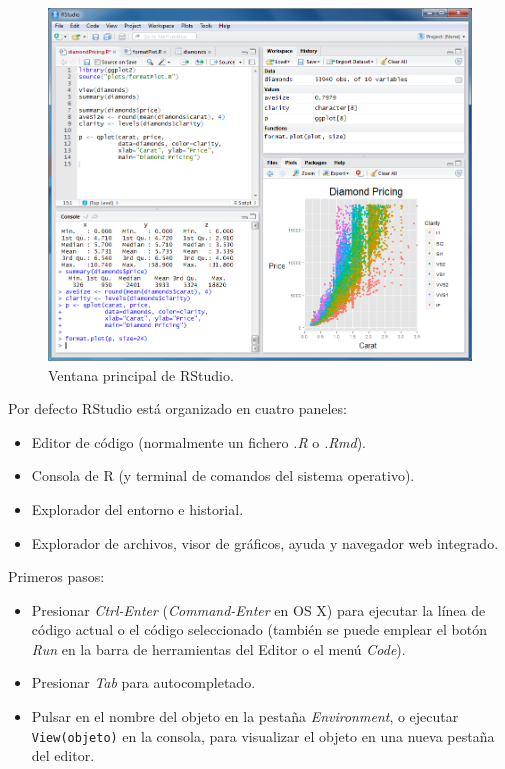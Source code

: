 \documentclass[
]{book}
\theoremstyle{break}
\theoremstyle{nonumberplain}
\begin{document}
\begin{figure}[!htb]

{\centering \includegraphics[width=0.7\linewidth]{figuras/rstudio} 

}

\caption{Ventana principal de RStudio.}\label{fig:rstudio}
\end{figure}

Por defecto RStudio está organizado en cuatro paneles:

\begin{itemize}
\item
  Editor de código (normalmente un fichero \emph{.R} o \emph{.Rmd}).
\item
  Consola de R (y terminal de comandos del sistema operativo).
\item
  Explorador del entorno e historial.
\item
  Explorador de archivos, visor de gráficos, ayuda y navegador web integrado.
\end{itemize}

Primeros pasos:

\begin{itemize}
\item
  Presionar \emph{Ctrl-Enter} (\emph{Command-Enter} en OS X) para ejecutar la línea de código actual o el código seleccionado (también se puede emplear el botón \emph{Run} en la barra de herramientas del Editor o el menú \emph{Code}).
\item
  Presionar \emph{Tab} para autocompletado.
\item
  Pulsar en el nombre del objeto en la pestaña \emph{Environment}, o ejecutar \texttt{View(objeto)} en la consola, para visualizar el objeto en una nueva pestaña del editor.
\end{itemize}
\end{document}
